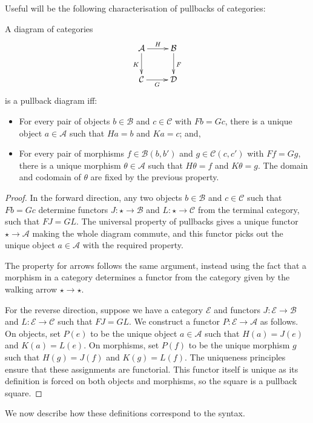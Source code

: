 Useful will be the following characterisation of pullbacks of categories:
\begin{lemma}
\label{lem:pullbacks-in-cat}
A diagram of categories
\[ \xymatrix{
    \mathcal{A} \ar[r]^-{H} \ar[d]_K & \mathcal{B} \ar[d]^F \\
    \mathcal{C} \ar[r]_-{G} & \mathcal{D}
  }\]
is a pullback diagram iff:
\begin{itemize}
\item For every pair of objects $b \in \mathcal{B}$ and $c \in \mathcal{C}$ with $Fb = Gc$, there is a unique object $a \in \mathcal{A}$ such that $Ha = b$ and $Ka = c$; and,
\item For every pair of morphisms $f \in \mathcal{B}(b,b')$ and $g \in \mathcal{C}(c,c')$ with $Ff= Gg$, there is a unique morphism $\theta \in \mathcal{A}$ such that $H\theta = f$ and $K\theta = g$. The domain and codomain of $\theta$ are fixed by the previous property.
\end{itemize}
\end{lemma}
\begin{proof}
In the forward direction, any two objects $b \in \mathcal{B}$ and $c \in \mathcal{C}$ such that $Fb = Gc$ determine functors $J : \star \to \mathcal{B}$ and $L : \star \to \mathcal{C}$ from the terminal category, such that $FJ = GL$. The universal property of pullbacks gives a unique functor $\star \to \mathcal{A}$ making the whole diagram commute, and this functor picks out the unique object $a \in \mathcal{A}$ with the required property. 

The property for arrows follows the same argument, instead using the fact that a morphism in a category determines a functor from the category given by the walking arrow $\star \to \star$.

For the reverse direction, suppose we have a category $\mathcal{E}$ and functors $J : \mathcal{E} \to \mathcal{B}$ and $L : \mathcal{E} \to \mathcal{C}$ such that $FJ = GL$. We construct a functor $P : \mathcal{E} \to \mathcal{A}$ as follows. On objects, set $P(e)$ to be the unique object $a \in \mathcal{A}$ such that $H(a) = J(e)$ and $K(a) = L(e)$. On morphisms, set $P(f)$ to be the unique morphism $g$ such that $H(g) = J(f)$ and $K(g) = L(f)$. The uniqueness principles ensure that these assignments are functorial. This functor itself is unique as its definition is forced on both objects and morphisms, so the square is a pullback square.
\end{proof}

We now describe how these definitions correspond to the syntax.

